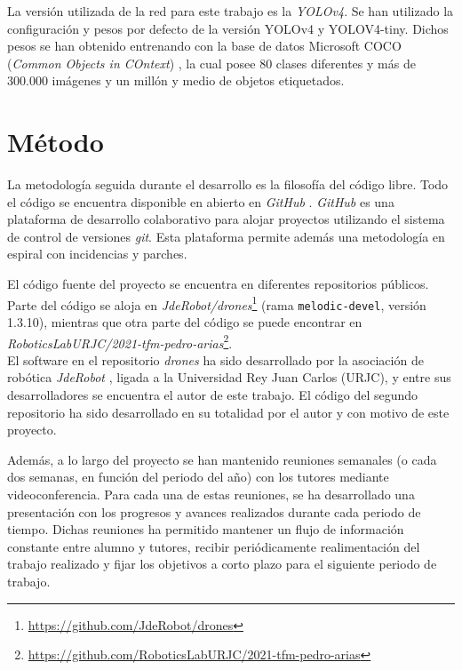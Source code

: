 \documentclass[../main.tex]{subfiles}
\begin{document}
La versión utilizada de la red para este trabajo es la \textit{YOLOv4}. Se han utilizado la configuración y pesos por defecto de la versión YOLOv4 y YOLOV4-tiny. Dichos pesos se han obtenido entrenando con la base de datos Microsoft COCO (\emph{Common Objects in COntext}) \cite{lin2014microsoft}, la cual posee 80 clases diferentes y más de 300.000 imágenes y un millón y medio de objetos etiquetados.

\section{Método} \label{section:met-met}
La metodología seguida durante el desarrollo es la filosofía del código libre. Todo el código se encuentra disponible en abierto en \emph{GitHub} \cite{github}. \emph{GitHub} es una plataforma de desarrollo colaborativo para alojar proyectos utilizando el sistema de control de versiones \emph{git}. Esta plataforma permite además una metodología en espiral con incidencias y parches.

El código fuente del proyecto se encuentra en diferentes repositorios públicos. Parte del código se aloja en \emph{JdeRobot/drones}\footnote{\url{https://github.com/JdeRobot/drones}} (rama \lstinline{melodic-devel}, versión 1.3.10), mientras que otra parte del código se puede encontrar en \emph{RoboticsLabURJC/2021-tfm-pedro-arias}\footnote{\url{https://github.com/RoboticsLabURJC/2021-tfm-pedro-arias}}. \\
El software en el repositorio \emph{drones} ha sido desarrollado por la asociación de robótica \emph{JdeRobot} \cite{jderobot}, ligada a la Universidad Rey Juan Carlos (URJC), y entre sus desarrolladores se encuentra el autor de este trabajo. El código del segundo repositorio ha sido desarrollado en su totalidad por el autor y con motivo de este proyecto.

Además, a lo largo del proyecto se han mantenido reuniones semanales (o cada dos semanas, en función del periodo del año) con los tutores mediante videoconferencia. Para cada una de estas reuniones, se ha desarrollado una presentación con los progresos y avances realizados durante cada periodo de tiempo. Dichas reuniones ha permitido mantener un flujo de información constante entre alumno y tutores, recibir periódicamente realimentación del trabajo realizado y fijar los objetivos a corto plazo para el siguiente periodo de trabajo.
\end{document}
